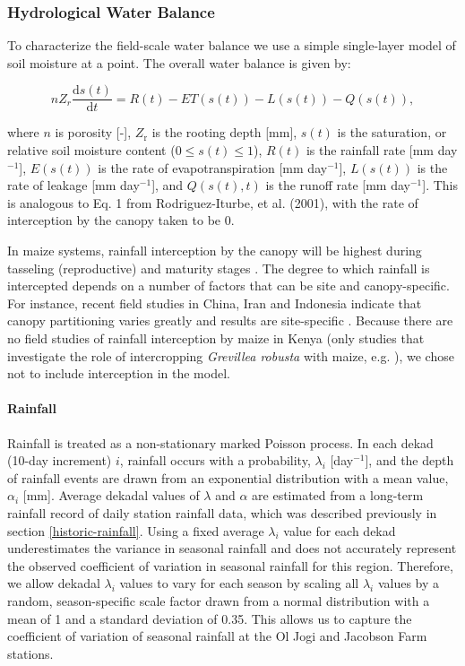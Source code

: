 \subsubsection{Hydrological Water Balance}
To characterize the field-scale water balance we use a simple single-layer model of soil moisture at a point. The overall water balance is given by:

\begin{equation}
\label{eq:h2o}
    n Z_r \frac{\text{d}s(t)}{\text{d}t} = R(t) - ET(s(t)) - L(s(t)) - Q(s(t)),
\end{equation}

\noindent
where $n$ is porosity [-], $Z_{\text{r}}$ is the rooting depth [mm], $s(t)$ is the saturation, or relative soil moisture content ($0 \leq s(t) \leq 1$), $R(t)$ is the rainfall rate [mm day$^{-1}$], $E(s(t))$ is the rate of evapotranspiration [mm day$^{-1}$], $L(s(t))$ is the rate of leakage [mm day$^{-1}$], and $Q(s(t),t)$ is the runoff rate [mm day$^{-1}$]. This is analogous to Eq. 1 from Rodriguez-Iturbe, et al. (2001), with the rate of interception by the canopy taken to be 0. 

In maize systems, rainfall interception by the canopy will be highest during tasseling (reproductive) and maturity stages \cite{zheng2018rainfall}. The degree to which rainfall is intercepted depends on a number of factors that can be site and canopy-specific. For instance, recent field studies in China, Iran and Indonesia indicate that canopy partitioning varies greatly and results are site-specific \cite{van2001modelling, zheng2018rainfall, nazari2020rainfall}. Because there are no field studies of rainfall interception by maize in Kenya (only studies that investigate the role of intercropping \textit{Grevillea robusta} with maize, e.g. ), we chose not to include interception in the model.

\paragraph{Rainfall}

Rainfall is treated as a non-stationary marked Poisson process. In each dekad (10-day increment) $i$, rainfall occurs with a probability, $\lambda_i$ [day$^{-1}$], and the depth of rainfall events are drawn from an exponential distribution with a mean value, $\alpha_i$ [mm]. Average dekadal values of $\lambda$ and $\alpha$ are estimated from a long-term rainfall record of daily station rainfall data, which was described previously in section \ref{historic-rainfall}. Using a fixed average $\lambda_i$ value for each dekad underestimates the variance in seasonal rainfall and does not accurately represent the observed coefficient of variation in seasonal rainfall for this region. Therefore, we allow dekadal $\lambda_i$ values to vary for each season by scaling all $\lambda_i$ values by a random, season-specific scale factor drawn from a normal distribution with a mean of 1 and a standard deviation of 0.35. This allows us to capture the coefficient of variation of seasonal rainfall at the Ol Jogi and Jacobson Farm stations. 

